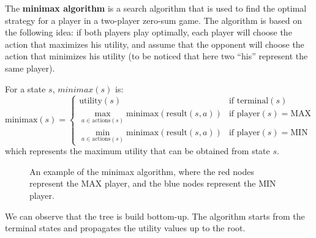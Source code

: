\documentclass[a4paper,12pt]{article}
\begin{document}
The \textbf{minimax algorithm} is a search algorithm that is used to find the optimal strategy for a player in a two-player zero-sum game. The algorithm is based on the following idea: if both players play optimally, each player will choose the action that maximizes his utility, and assume that the opponent will choose the action that minimizes his utility (to be noticed that here two ``his'' represent the same player).

For a state $s$, $minimax(s)$ is:
\begin{equation*}
  \text{minimax}(s) = \begin{cases}
    \text{utility}(s) & \text{if } \text{terminal}(s) \\
    \max_{a \in \text{actions}(s)} \text{minimax}(\text{result}(s, a)) & \text{if } \text{player}(s) = \text{MAX} \\
    \min_{a \in \text{actions}(s)} \text{minimax}(\text{result}(s, a)) & \text{if } \text{player}(s) = \text{MIN}
  \end{cases}
\end{equation*}
which represents the maximum utility that can be obtained from state $s$.

\begin{figure}[H]
  \centering
  \caption{An example of the minimax algorithm, where the red nodes represent the MAX player, and the blue nodes represent the MIN player.}
\end{figure}

We can observe that the tree is build bottom-up. The algorithm starts from the terminal states and propagates the utility values up to the root. 
\end{document}
